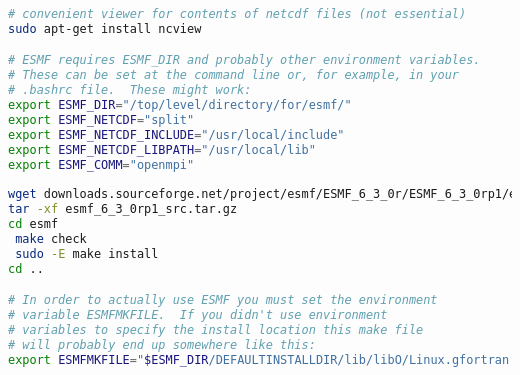 \documentclass[12pt]{article}
\begin{document}
\begin{lstlisting}[language=bash]
# convenient viewer for contents of netcdf files (not essential)
sudo apt-get install ncview

# ESMF requires ESMF_DIR and probably other environment variables.  
# These can be set at the command line or, for example, in your 
# .bashrc file.  These might work:
export ESMF_DIR="/top/level/directory/for/esmf/"
export ESMF_NETCDF="split"
export ESMF_NETCDF_INCLUDE="/usr/local/include"
export ESMF_NETCDF_LIBPATH="/usr/local/lib"
export ESMF_COMM="openmpi"
                                                                                                              
wget downloads.sourceforge.net/project/esmf/ESMF_6_3_0r/ESMF_6_3_0rp1/esmf_6_3_0rp1_src.tar.gz
tar -xf esmf_6_3_0rp1_src.tar.gz
cd esmf 
 make check
 sudo -E make install
cd ..

# In order to actually use ESMF you must set the environment 
# variable ESMFMKFILE.  If you didn't use environment 
# variables to specify the install location this make file 
# will probably end up somewhere like this:
export ESMFMKFILE="$ESMF_DIR/DEFAULTINSTALLDIR/lib/libO/Linux.gfortran.64.openmpi.default/esmf.mk"

\end{lstlisting}
\end{document}

